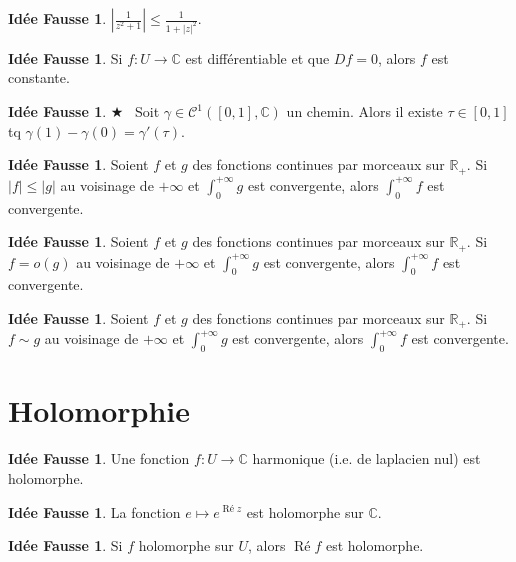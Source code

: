 \documentclass[11pt,a4paper]{article}
\newcommand{\R}{\mathbb{R}}
\newcommand{\C}{\mathbb{C}}
\DeclareMathOperator{\PR}{\text{Ré}}
\newcommand\abs[1]{\left|#1\right|}
\theoremstyle{definition}
\newtheorem{ideeFausse}[theoreme]{Idée Fausse}
\theoremstyle{plain}
\newcommand{\important}{$\bigstar$~}
\begin{document}
\begin{ideeFausse}
$\abs{\frac{1}{z^2+1}} \leq \frac{1}{1+|z|^2}$.
\end{ideeFausse}



\begin{ideeFausse}
Si $f : U\to \C$ est différentiable et que $Df=0$, alors $f$ est constante.
\end{ideeFausse}


\begin{ideeFausse} \important
Soit $\gamma \in \mathcal C^1([0,1],\C)$ un chemin.
Alors il existe $\tau\in[0,1]$ tq $\gamma(1) - \gamma(0) = \gamma'(\tau)$. 
\end{ideeFausse}


\begin{ideeFausse}
Soient $f$ et $g$ des fonctions continues par morceaux sur $\R_+$.
Si $|f|\leq |g|$ au voisinage de $+\infty$ et $\int_0^{+\infty} g$ est convergente, alors $\int_0^{+\infty} f$ est convergente.
\end{ideeFausse}

\begin{ideeFausse}
Soient $f$ et $g$ des fonctions continues par morceaux sur $\R_+$.
Si $f=o(g)$ au voisinage de $+\infty$ et $\int_0^{+\infty} g$ est convergente, alors $\int_0^{+\infty} f$ est convergente.
\end{ideeFausse}

\begin{ideeFausse}
Soient $f$ et $g$ des fonctions continues par morceaux sur $\R_+$.
Si $f\sim g$ au voisinage de $+\infty$ et $\int_0^{+\infty} g$ est convergente, alors $\int_0^{+\infty} f$ est convergente.
\end{ideeFausse}


\section{Holomorphie}


\begin{ideeFausse}
Une fonction $f : U\to \C$ harmonique (i.e. de laplacien nul) est holomorphe.
\end{ideeFausse}


\begin{ideeFausse}
La fonction $e\mapsto e^{\PR z}$ est holomorphe sur $\C$.
\end{ideeFausse}

\begin{ideeFausse}
Si $f$ holomorphe sur $U$, alors $\PR f$ est holomorphe.
\end{ideeFausse}
\end{document}
